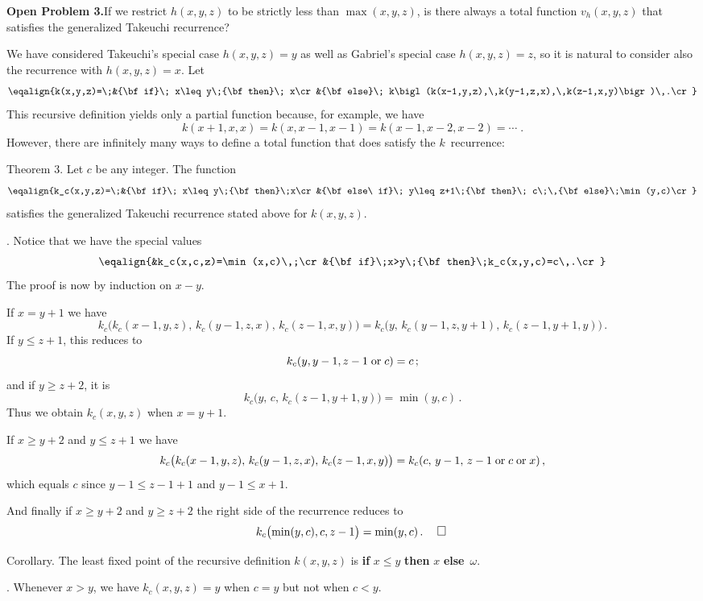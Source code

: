 \documentclass{article}
\begin{document}
\bigskip\noindent
{\bf Open Problem 3.}\enspace If we restrict $h(x,y,z)$ to be strictly
less than $\max(x,y,z)$, is there always a total function $v_h(x,y,z)$
that satisfies the generalized Takeuchi recurrence?\quad\pfbox

\bigskip
We have considered Takeuchi's special case $h(x,y,z)=y$ 
as well as  Gabriel's
special case ${h(x,y,z)=z}$, so it is natural to consider also the
recurrence with $h(x,y,z)=x$. Let
$$\eqalign{k(x,y,z)=\;&{\bf if}\; x\leq y\;{\bf then}\; x\cr
&{\bf else}\; k\bigl(k(x-1,y,z),\,k(y-1,z,x),\,k(z-1,x,y)\bigr)\,.\cr}$$
This recursive definition yields only a partial function because, for
example, we have
$$k(x+1,x,x)=k(x,x-1,x-1)=k(x-1,x-2,x-2)=\cdots\;.$$
However, there are infinitely many ways to define a total function
that does satisfy the $k$~recurrence:

\proclaim Theorem 3. Let $c$ be any integer. The function
$$\eqalign{k_c(x,y,z)=\;&{\bf if}\; x\leq y\;{\bf then}\;x\cr
&{\bf else\ if}\; y\leq z+1\;{\bf then}\; c\;\,{\bf
else}\;\min(y,c)\cr}$$
satisfies the generalized Takeuchi recurrence stated above for
$k(x,y,z)$.

.\enspace
Notice that we have the special values
$$\eqalign{&k_c(x,c,z)=\min(x,c)\,;\cr
&{\bf if}\;x>y\;{\bf then}\;k_c(x,y,c)=c\,.\cr}$$
The proof is now by induction on $x-y$.

If $x=y+1$ we have
$$k_c\bigl(k_c(x-1,y,z),\,k_c(y-1,z,x),\,k_c(z-1,x,y)\bigr)
=k_c\bigl(y,\,k_c(y-1,z,y+1),\,k_c(z-1,y+1,y)\bigr)\,.$$
If $y\leq z+1$, this reduces to
$$k_c(y,y-1,z-1\;{\rm or}\; c)=c\,;$$
and if $y\geq z+2$, it is
$$k_c\bigl(y,\,c,\,k_c(z-1,y+1,y)\bigr)=\min(y,c)\,.$$
Thus we obtain $k_c(x,y,z)$ when $x=y+1$.

If $x\geq y+2$ and $y\leq z+1$ we have
$$k_c\bigl(k_c(x-1,y,z),\,k_c(y-1,z,x),\,k_c(z-1,x,y)\bigr)
=k_c(c,\,y-1,\,z-1\;{\rm or}\; c\;{\rm or}\; x)\,,$$
which equals $c$ since $y-1\leq z-1+1$ and $y-1\leq x+1$.

And finally if $x\geq y+2$ and $y\geq z+2$ the right side of the
recurrence reduces to
$$k_c\bigl(\min(y,c),c,z-1\bigr)=\min(y,c)\,.\quad\pfbox$$

\proclaim Corollary. The least fixed point of the recursive definition
$k(x,y,z)$ is {\bf if} $x\leq y$ {\bf then} $x$ {\bf else}~$\omega$.

.\enspace
Whenever $x>y$, we have $k_c(x,y,z)=y$ when $c=y$ but not when
$c<y$.\quad\pfbox 
\end{document}
